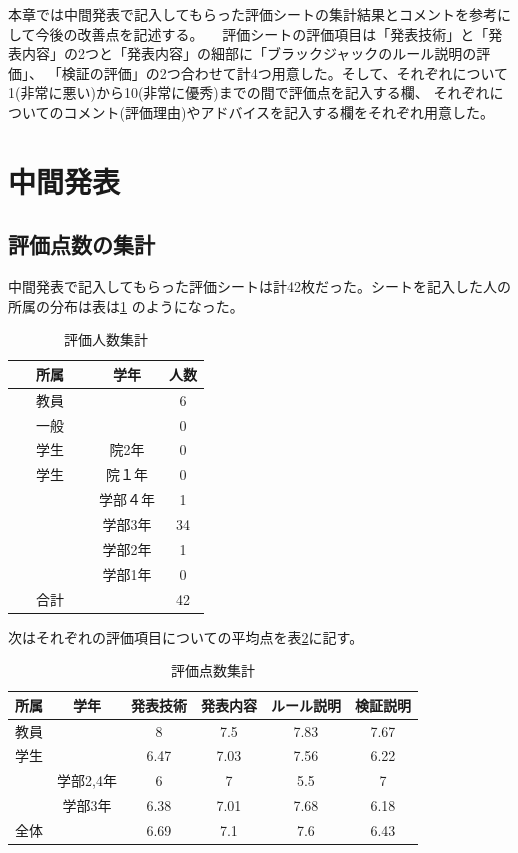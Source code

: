  本章では中間発表で記入してもらった評価シートの集計結果とコメントを参考にして今後の改善点を記述する。
　評価シートの評価項目は「発表技術」と「発表内容」の2つと「発表内容」の細部に「ブラックジャックのルール説明の評価」、
「検証の評価」の2つ合わせて計4つ用意した。そして、それぞれについて1(非常に悪い)から10(非常に優秀)までの間で評価点を記入する欄、
それぞれについてのコメント(評価理由)やアドバイスを記入する欄をそれぞれ用意した。
\section{中間発表}
\subsection{評価点数の集計}
中間発表で記入してもらった評価シートは計42枚だった。シートを記入した人の所属の分布は表は\ref{tab:dist} のようになった。

\begin{table}[htb]
  \begin{center}
    \caption{評価人数集計}
    \begin{tabular}{|c|c|c|} \hline 
      所属 & 学年 & 人数  \\ \hline \hline
      教員 &  & 6  \\
      一般 &  & 0 \\
      学生 & 院2年 & 0 \\
     学生 & 院１年 & 0 \\
             & 学部４年 & 1 \\
 　　　　　 & 学部3年 & 34 \\
             & 学部2年 & 1 \\
             & 学部1年 & 0 \\ \hline \hline
      合計 &  & 42 \\ \hline
    \end{tabular}
    \label{tab:dist}
  \end{center}
\end{table}
次はそれぞれの評価項目についての平均点を表\ref{tab:point}に記す。
\begin{table}[htb]
\begin{center}
\caption{評価点数集計}
\begin{tabular}{|c|c|c|c|c|c|} \hline
  所属 & 学年 & 発表技術 & 発表内容 & ルール説明 & 検証説明  \\ \hline \hline
  教員 &        & 8 & 7.5 & 7.83 & 7.67 \\
  学生 &        & 6.47 & 7.03 & 7.56 & 6.22 \\
         & 学部2,4年 & 6 & 7 & 5.5 & 7 \\
         & 学部3年 & 6.38 & 7.01 & 7.68 & 6.18 \\ \hline \hline
  全体 &        & 6.69 & 7.1 & 7.6 & 6.43 \\ \hline
\end{tabular}
\label{tab:point}
\end{center}
\end{table}

